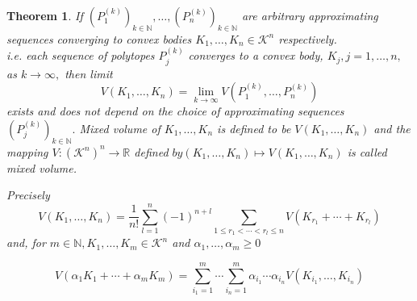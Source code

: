 \documentclass[oneside]{book}
\newtheorem{theorem}{Theorem}[section]
\begin{document}
	\begin{theorem}
		\label{t:10}
		If $\left(P_{1}^{(k)}\right)_{k \in \mathbb{N}}, \ldots,\left(P_{n}^{(k)}\right)_{k \in \mathbb{N}}$ are arbitrary approximating
		\\ 
		
		sequences converging to convex bodies  $K_{1}, \ldots, K_{n} \in \mathcal{K}^{n}$ respectively.
		\\
		i.e. each sequence of polytopes $P_{j}^{(k)}$ converges to a convex body, 
		$K_{j}, j=1, \ldots, n,$ as $k \rightarrow \infty,$ 
		then limit 
		\begin{equation}
		\label{eq51}
		V\left(K_{1}, \ldots, K_{n}\right)=\lim _{k \rightarrow \infty} V\left(P_{1}^{(k)}, \ldots, P_{n}^{(k)}\right)
		\end{equation}
		exists and does not depend on the choice of approximating sequences $\left(P_{j}^{(k)}\right)_{k \in \mathbb{N}}. $ \newline
		Mixed volume of $K_{1}, \ldots, K_{n} $ is defined to be $V\left(K_{1}, \ldots, K_{n}\right)$ \newline
		and the mapping $V:\left(\mathcal{K}^{n}\right)^{n} \rightarrow \mathbb{R}$ defined $b y\left(K_{1}, \ldots, K_{n}\right) \mapsto V\left(K_{1}, \ldots, K_{n}\right)$ is called mixed volume.\newline
		
		Precisely 
		\begin{equation} 
		\label{eq52}
		V\left(K_{1}, \ldots, K_{n}\right)=\frac{1}{n !} \sum_{l=1}^{n}(-1)^{n+l} \sum_{1 \leq r_{1}<\cdots<r_{l} \leq n} V\left(K_{r_{1}}+\cdots+K_{r_{l}}\right)
		\end{equation}
		and, for $m \in \mathbb{N}, K_{1}, \ldots, K_{m} \in \mathcal{K}^{n}$ and $\alpha_{1}, \ldots, \alpha_{m} \geq 0$
		
		
		\begin{equation}
		\label{eq53}
		V\left(\alpha_{1} K_{1}+\cdots+\alpha_{m} K_{m}\right)=\sum_{i_{1}=1}^{m} \cdots \sum_{i_{n}=1}^{m} \alpha_{i_{1}} \cdots \alpha_{i_{n}} V\left(K_{i_{1}}, \ldots, K_{i_{n}}\right)
		\end{equation}
	\end{theorem}
	
\end{document}
